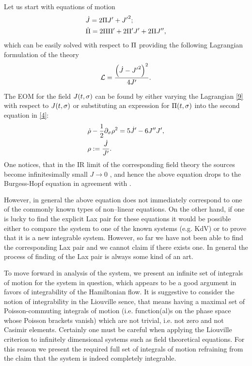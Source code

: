 \documentclass[12pt]{article}%
\numberwithin{equation}{section}
\begin{document}
Let us start with equations of motion
\begin{equation}
 \label{4}
\begin{split}
 & \dot{J}=2\P J'+{J'}^2;\\
 & \dot{\P}=2\P\P'+2\P' J'+2\P J'',
\end{split}
\end{equation}
which can be easily solved with respect to $\P$ providing the following Lagrangian formulation of the theory
\begin{equation}
 \label{9}
 \mc{L}=\fr{\left(\dot{J}-{J'}^2\right)^2}{4J'}.
\end{equation}

The EOM for the field $J(t,\s)$ can be found by either varying the Lagrangian \eqref{9} with respect to $J(t,\s)$ or substituting an expression for $\P(t,\s)$ into the second equation in \eqref{4}:
\begin{equation}
 \label{10}
\begin{aligned}
&\dot{\r}-\fr12\dt_\s\r^2=5\dot{J}'-6J''J',\\
&\r:=\fr{\dot{J}}{J'}.
\end{aligned}
\end{equation}
One notices, that in the IR limit of the corresponding field theory the sources become infinitesimally small $J\to0$ , and hence the above equation drops to the Burgess-Hopf equation in agreement with \cite{Akhmedov:2010mz}.

However, in general the  above equation does not immediately correspond to one of the commonly known types of non--linear equations. On the other hand, if one is lucky to find the explicit Lax pair for these equations it would be possible either to compare the system to one of the known systems (e.g. KdV) or to prove that it is a new integrable system. However, so far we have not been able to find the corresponding Lax pair and we cannot claim if there exists one. In general the process of finding of the Lax pair is always some kind of an art.  

To move forward in analysis of the system, we present an infinite set of integrals of motion for the system in question, which appears to be a good argument in favors of integrability of the Hamiltonian flow. It is suggestive to consider the notion of integrability in the Liouville sence, that means having a maximal set of Poisson-commuting integrals of motion (i.e. function(al)s on the phase space whose Poisson brackets vanish) which are not trivial, i.e. not zero and not Casimir elements. Certainly one must be careful when applying the Liouville criterion to infinitely dimensional systems such as field theoretical equations. For this reason we present the required full set of integrals of motion refraining from the claim that the system is indeed completely integrable.
\end{document}
